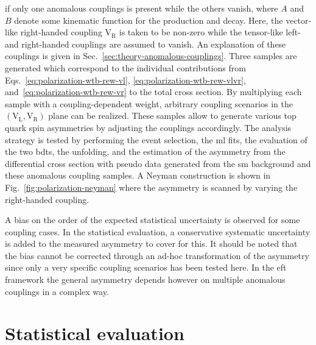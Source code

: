 if only one anomalous couplings is present while the others vanish, where $A$ and $B$ denote some kinematic function for the production and decay. Here, the vector-like right-handed coupling $\mathrm{V}_\mathrm{R}$ is taken to be non-zero while the tensor-like left- and right-handed couplings are assumed to vanish. An explanation of these couplings is given in Sec.~\ref{sec:theory-anomalous-couplings}. Three samples are generated which correspond to the individual contributions from Eqs.~\ref{eq:polarization-wtb-rew-vl}, \ref{eq:polarization-wtb-rew-vlvr}, and~\ref{eq:polarization-wtb-rew-vr} to the total cross section. By multiplying each sample with a coupling-dependent weight, arbitrary coupling scenarios in the $(\mathrm{V}_\mathrm{L},\mathrm{V}_\mathrm{R})$ plane can be realized. These samples allow to generate various top quark spin asymmetries by adjusting the couplings accordingly. The analysis strategy is tested by performing the event selection, the \gls{ml} fits, the evaluation of the two \glspl{bdt}, the unfolding, and the estimation of the asymmetry from the differential cross section with pseudo data generated from the \gls{sm} background and these anomalous coupling samples. A Neyman construction is shown in Fig.~\ref{fig:polarization-neyman} where the asymmetry is scanned by varying the right-handed coupling.



A bias on the order of the expected statistical uncertainty is observed for some coupling cases. In the statistical evaluation, a conservative systematic uncertainty is added to the measured asymmetry to cover for this. It should be noted that the bias cannot be corrected through an ad-hoc transformation of the asymmetry since only a very specific coupling scenarios has been tested here. In the \gls{eft} framework the general asymmetry depends however on multiple anomalous couplings in a complex way.



\section{Statistical evaluation}

